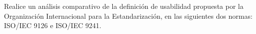 Realice un análisis comparativo de la definición de usabilidad propuesta por la Organización Internacional para la Estandarización, en las siguientes dos normas: ISO/IEC 9126 e ISO/IEC 9241.
